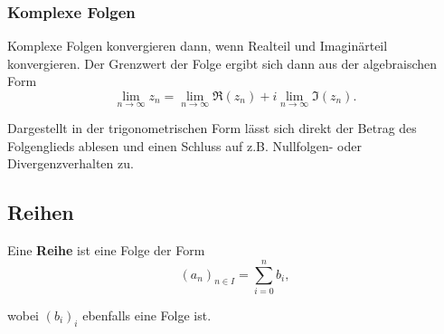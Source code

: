 \documentclass{article}
\begin{document}
\subsubsection*{Komplexe Folgen}
Komplexe Folgen konvergieren dann, wenn Realteil und Imaginärteil konvergieren. Der Grenzwert der Folge ergibt sich dann aus der algebraischen Form
	\begin{equation}
		\lim_{n\rightarrow\infty} z_n = \lim_{n\rightarrow\infty} \Re(z_n) + i \lim_{n\rightarrow\infty} \Im(z_n).
	\end{equation}

Dargestellt in der trigonometrischen Form lässt sich direkt der Betrag des Folgenglieds ablesen und einen Schluss auf z.B. Nullfolgen- oder Divergenzverhalten zu.





\newpage


\subsection{Reihen}
Eine \textbf{Reihe} ist eine Folge der Form
	\begin{equation}
		(a_n)_{n\in I} = \sum_{i=0}^n b_i,
	\end{equation}

wobei $(b_i)_i$ ebenfalls eine Folge ist.
\end{document}
